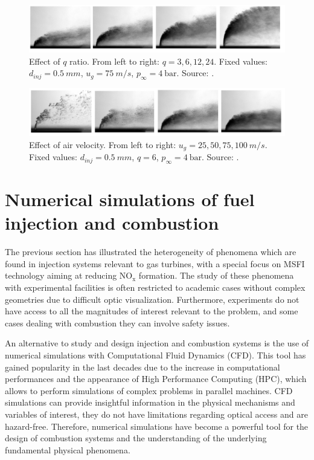 \begin{figure}[h!]
	\centering
	\includegraphics[scale=0.45]{./part0_intro/parametric_JICF_q_ratio}
	\caption{Effect of $q$ ratio. From left to right: $q = 3, 6, 12, 24$. Fixed values: $d_{inj} = 0.5 ~mm$, $u_g = 75 ~m/s$, $p_\infty = 4 ~\mathrm{bar}$. Source: .}
	\label{fig:parametric_JICF_q_ratio}
\end{figure}

\begin{figure}[h!]
	\centering
	\includegraphics[scale=0.45]{./part0_intro/parametric_JICF_air_velocity}
	\caption{Effect of air velocity. From left to right: $u_g = 25, 50, 75, 100 ~m/s$. Fixed values: $d_{inj} = 0.5 ~mm$, $q = 6$, $p_\infty = 4 ~\mathrm{bar}$. Source: .}
	\label{fig:parametric_JICF_air_velocity}
\end{figure}


\section{Numerical simulations of fuel injection and combustion }

The previous section has illustrated the heterogeneity of phenomena which are found in injection systems relevant to gas turbines, with a special focus on MSFI technology aiming at reducing NO$_\mathrm{x}$ formation. The study of these phenomena with experimental facilities is often restricted to academic cases without complex geometries due to difficult optic visualization. Furthermore, experiments do not have access to all the magnitudes of interest relevant to the problem, and some cases dealing with combustion they can involve safety issues.

An alternative to study and design injection and combustion systems is the use of numerical simulations with Computational Fluid Dynamics (CFD). This tool has gained popularity in the last decades due to the increase in computational performances and the appearance of High Performance Computing (HPC), which allows to perform simulations of complex problems in parallel machines. CFD simulations can provide insightful information in the physical mechanisms and variables of interest, they do not have limitations regarding optical access and are hazard-free. Therefore, numerical simulations have become a powerful tool for the design of combustion systems and the understanding of the underlying fundamental physical phenomena.

